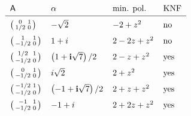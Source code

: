 \documentclass[12pt]{svmult}
\def\ii{\mathbf{i}}
\def\AA{\mathsf{A}}             %
\newenvironment{klein}{\bigl(\begin{smallmatrix}}{\end{smallmatrix}\bigl)}
\begin{document}
$$
\def\arraystretch{1.6}
\arraycolsep=2mm
\begin{array}[h]{llll}
\AA &  \alpha &  \text{min. pol.} & \text{KNF} \\
\hline
\begin{klein}
 0  &  1 \\
 1/2  &  0 \\
\end{klein}
  &  -\sqrt{2}  &  -2+z^2 & \text{no} \\
\begin{klein}
 1  &  1 \\
 -1/2  &  0 \\
\end{klein}
  &  1+i  &  2-2 z+z^2 & \text{no} \\
\begin{klein}
 1/2  &  1 \\
 -1/2  &  0 \\
\end{klein}
  &  \left(1+ \ii \sqrt{7}\right)/2  &  2-z+z^2 & \text{yes} \\
\begin{klein}
 0  &  1 \\
 -1/2  &  0 \\
\end{klein}
  &  i \sqrt{2}  &  2+z^2 & \text{yes} \\
\begin{klein}
 -1/2  &  1 \\
 -1/2  &  0 \\
\end{klein}
  &  \left(-1+ \ii\sqrt{7}\right)/2  &  2+z+z^2 & \text{yes} \\
\begin{klein}
 -1  &  1 \\
 -1/2  &  0 \\
\end{klein}
  &  -1+i  &  2+2 z+z^2 & \text{yes} \\
\end{array}
$$
\end{document}
